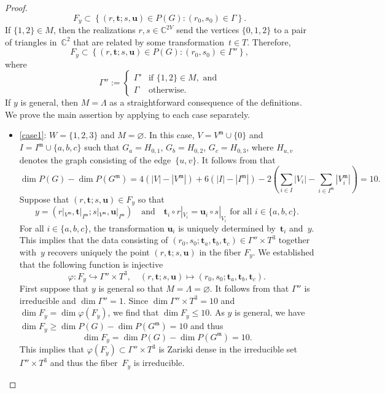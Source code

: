 \documentclass[12pt]{article}
\theoremstyle{definition}
\newenvironment{Mlist}{\begin{itemize}[topsep=0pt,itemsep=0pt,leftmargin=7mm]}{\end{itemize}}
\newcommand{\st}{such that }
\renewcommand{\c}{\colon}
\newcommand{\set}[2]{\left\{#1:#2\right\}}
\newcommand{\C}{{\mathbb{C}}}
\newcommand{\bt}{\mathbf{t}}
\newcommand{\bu}{\mathbf{u}}
\newcommand{\m}{\mathfrak{m}}
\begin{document}
\begin{proof}
\[
F_y\subset
\set{(r,\bt;s,\bu)\in P(G)}{(r_0,s_0)\in\Gamma
}.
\]
If $\{1,2\}\in M$, then the realizations $r, s\in\C^{2V}$ send the vertices $\{0,1,2\}$
to a pair of triangles in~$\C^2$ that are related by some transformation~$t\in T$.
Therefore,
\[
F_y\subset
\set{(r,\bt;s,\bu)\in P(G)}{(r_0,s_0)\in\Gamma''
},
\]
where
\[
\Gamma'':=
\begin{cases}
\Gamma' & \text{if } \{1,2\}\in M, \text{ and}\\
\Gamma  & \text{otherwise}.
\end{cases}
\]
If $y$ is general, then $M=\Lambda$ as a straightforward consequence of the definitions.
We prove the main assertion by applying  to each case separately.
\begin{Mlist}
\item \ref{case1}: $W=\{1,2,3\}$ and $M=\varnothing$.
In this case, $V=V^\m\cup\{0\}$ and $I=I^\m\cup\{a,b,c\}$ \st $G_a=H_{0,1}$, $G_b=H_{0,2}$, $G_c=H_{0,3}$,
where $H_{u,v}$ denotes the graph consisting of the edge~$\{u,v\}$.
It follows from  that
\[
\dim P(G)-\dim P(G^\m)=4(|V|-|V^\m|)+6(|I|-|I^\m|)-2(\sum_{i\in I}|V_i|-\sum_{i\in I^\m}|V^\m_i|)=10.
\]
Suppose that $(r,\bt;s,\bu)\in F_y$ so that
\[
y=(r|_{V^\m},\bt|_{I^\m};s|_{V^\m},\bu|_{I^\m})
\quad\text{and}\quad
\bt_i\circ r|_{V_i}=\bu_i\circ s|_{V_i}
\text{ for all }i\in\{a,b,c\}.
\]
For all $i\in\{a,b,c\}$, the transformation $\bu_i$ is uniquely determined by~$\bt_i$ and~$y$.
This implies that the data consisting of $(r_0,s_0;\bt_a,\bt_b,\bt_c)\in\Gamma''\times T^3$ together with~$y$
recovers uniquely the point $(r,\bt;s,\bu)$ in the fiber $F_y$.
We established that the following function is injective
\[
\varphi\c F_y\hookrightarrow\Gamma''\times T^3,\quad (r,\bt;s,\bu)\mapsto (r_0,s_0;\bt_a,\bt_b,\bt_c).
\]
First suppose that $y$ is general so that $M=\Lambda=\varnothing$.
It follows from  that $\Gamma''$ is irreducible and $\dim \Gamma''=1$.
Since $\dim \Gamma''\times T^3=10$ and $\dim F_y=\dim \varphi(F_y)$,
we find that $\dim F_y\leq 10$.
As $y$ is general, we have $\dim F_y\geq\dim P(G)-\dim P(G^\m)=10$
and thus
\[
\dim F_y=\dim P(G)-\dim P(G^\m)=10.
\]
This implies that $\varphi(F_y)\subset\Gamma''\times T^3$ is Zariski dense in
the irreducible set $\Gamma''\times T^3$
and thus the fiber~$F_y$ is irreducible.


\end{Mlist}
\end{proof}
\end{document}
